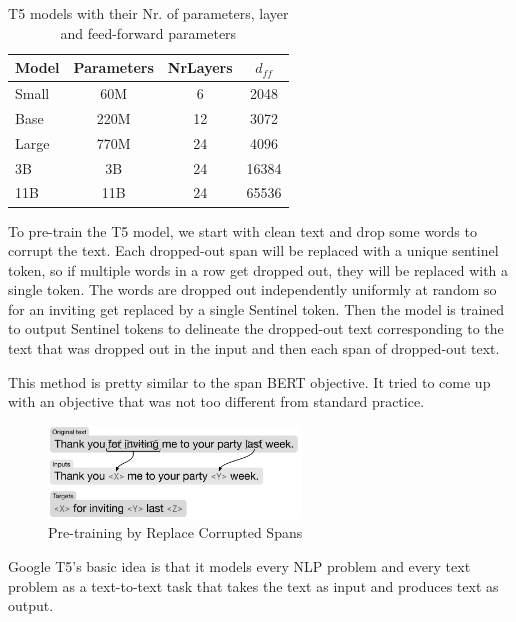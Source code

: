 \begin{table}[H]
    \centering
    \begin{tabular}{l c c c}
      \hline
      Model       & Parameters & NrLayers & $d_{ff}$ \\ 
      \hline
      Small     & 60M       & 6  & 2048        \\
      Base     & 220M       & 12  & 3072        \\
      Large     & 770M       & 24  & 4096        \\
      3B     & 3B       & 24  & 16384        \\
      11B     & 11B       & 24  & 65536        \\
      \hline
    \end{tabular}
    \caption{T5 models with their Nr. of parameters, layer and feed-forward parameters\cite{raffel_exploring_2020}}
\end{table}
  

To pre-train the T5 model, we start with clean text and drop some words to corrupt the text. Each dropped-out span will be replaced with a unique sentinel token, so if multiple words in a row get dropped out, they will be replaced with a single token. The words are dropped out independently uniformly at random so for an inviting get replaced by a single Sentinel token. Then the model is trained to output Sentinel tokens to delineate the dropped-out text corresponding to the text that was dropped out in the input and then each span of dropped-out text.

This method is pretty similar to the span BERT objective. It tried to come up with an objective that was not too different from standard practice.

\begin{figure}[H]
    \centering
    \includegraphics[width=0.6\textwidth]{pics/picard/t5-fine.png}
    \caption{Pre-training by Replace Corrupted Spans \cite{raffel_exploring_2020}}
\end{figure}

Google T5's basic idea is that it models every NLP problem and every text problem as a text-to-text task that takes the text as input and produces text as output.

